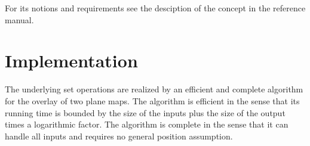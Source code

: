\begin{ccAdvanced}
For its notions and requirements see the desciption of the concept
 in the reference manual.
\end{ccAdvanced}

\section{Implementation}

The underlying set operations are realized by an efficient and
complete algorithm for the overlay of two plane maps. The algorithm is
efficient in the sense that its running time is bounded by the size of
the inputs plus the size of the output times a logarithmic factor. The
algorithm is complete in the sense that it can handle all inputs and
requires no general position assumption.



